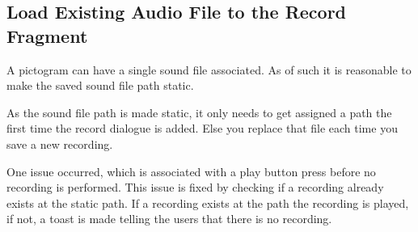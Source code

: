 \subsection{Load Existing Audio File to the Record Fragment}
A pictogram can have a single sound file associated.
As of such it is reasonable to make the saved sound file path static.

As the sound file path is made static, it only needs to get assigned a path the first time the record dialogue is added. 
Else you replace that file each time you save a new recording.

One issue occurred, which is associated with a play button press before no recording is performed.
This issue is fixed by checking if a recording already exists at the static path. If a recording exists at the path the recording is played, if not, a toast is made telling the users that there is no recording.